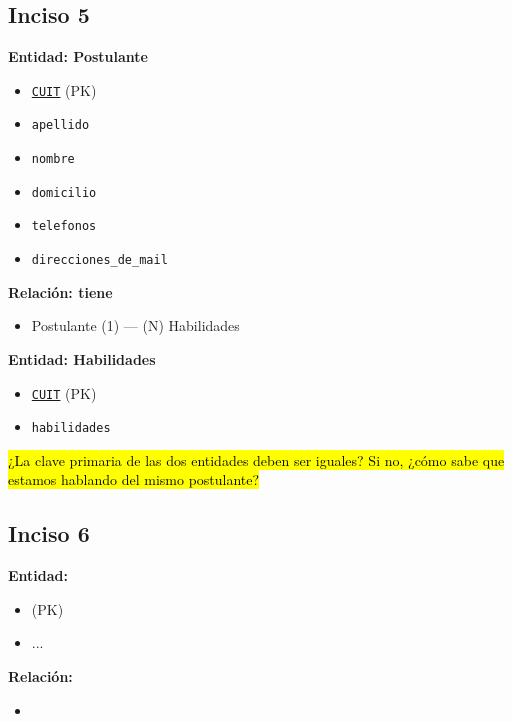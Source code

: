 \documentclass[a4paper,12pt]{article}
\begin{document}
        \subsection*{Inciso 5}
            \textbf{Entidad: Postulante}
                \begin{itemize}
                    \item \underline{\texttt{CUIT}} (PK)
                    \item \texttt{apellido}
                    \item \texttt{nombre}
                    \item \texttt{domicilio}
                    \item \texttt{telefonos}
                    \item \texttt{direcciones\_de\_mail}
                \end{itemize}

            \textbf{Relación: tiene}
                \begin{itemize}
                    \item Postulante (1) --- (N) Habilidades
                \end{itemize}

            \textbf{Entidad: Habilidades}
                \begin{itemize}
                    \item \underline{\texttt{CUIT}} (PK)
                    \item \texttt{habilidades}
                \end{itemize}
                \noindent \hl{¿La clave primaria de las dos entidades deben ser iguales? Si no, ¿cómo sabe que estamos hablando del mismo postulante?}

        \subsection*{Inciso 6}
            \textbf{Entidad: }
                \begin{itemize}
                    \item \underline{\texttt{}} (PK)
                    \item ...
                \end{itemize}

            \textbf{Relación: }
                \begin{itemize}
                    \item 
                \end{itemize}
\end{document}
